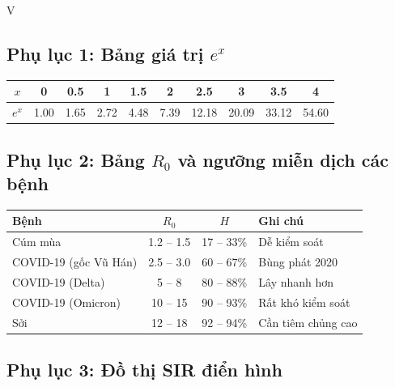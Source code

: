 \documentclass[12pt,a4paper]{article}
\newcommand{\header}[1]{\cellcolor{TableHeader}\sffamily\bfseries#1}
\begin{document}
\begin{competitionsection}{V}
\vspace{0.5cm}

\subsection*{Phụ lục 1: Bảng giá trị $e^x$}
\begin{center}
\begin{tabular}{|c|c|c|c|c|c|c|c|c|c|}
\hline
$x$ & 0 & 0.5 & 1 & 1.5 & 2 & 2.5 & 3 & 3.5 & 4 \\
\hline
$e^x$ & 1.00 & 1.65 & 2.72 & 4.48 & 7.39 & 12.18 & 20.09 & 33.12 & 54.60 \\
\hline
\end{tabular}
\end{center}

\subsection*{Phụ lục 2: Bảng $R_0$ và ngưỡng miễn dịch các bệnh}
\begin{center}
\begin{tabular}{|l|c|c|l|}
\hline
\header{Bệnh} & \header{$R_0$} & \header{$H$} & \header{Ghi chú} \\
\hline
Cúm mùa & 1.2 -- 1.5 & 17 -- 33\% & Dễ kiểm soát \\
COVID-19 (gốc Vũ Hán) & 2.5 -- 3.0 & 60 -- 67\% & Bùng phát 2020 \\
COVID-19 (Delta) & 5 -- 8 & 80 -- 88\% & Lây nhanh hơn \\
COVID-19 (Omicron) & 10 -- 15 & 90 -- 93\% & Rất khó kiểm soát \\
Sởi & 12 -- 18 & 92 -- 94\% & Cần tiêm chủng cao \\
\hline
\end{tabular}
\end{center}

\subsection*{Phụ lục 3: Đồ thị SIR điển hình}

\begin{center}


\end{center}
\end{competitionsection}
\end{document}
